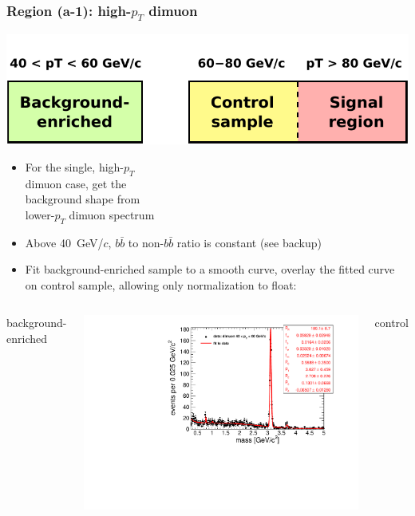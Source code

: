 \documentclass[compress]{beamer}
\begin{document}
\begin{frame}
\frametitle{Region (a-1): high-$p_T$ dimuon}

\hfill \includegraphics[width=0.5\linewidth]{bkgnd_control_signal_a-1.pdf}

\vspace{-1.5 cm}
\begin{itemize}
\item For the single, high-$p_T$ \\ dimuon case, get the \\ background shape from \\ lower-$p_T$ dimuon spectrum
\item Above 40~GeV/$c$, $b\bar{b}$ to non-$b\bar{b}$ ratio is constant (see backup)
\item Fit background-enriched sample to a smooth curve, overlay the fitted curve on control sample, allowing only normalization to float:
\end{itemize}

\begin{columns}
\centering background-enriched

\includegraphics[width=\linewidth]{fullscale-backgroundEnriched_highpt.pdf}

\centering control


\end{columns}
\end{frame}
\end{document}
